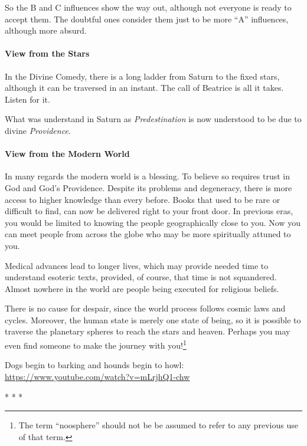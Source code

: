 So the B and C influences show the way out, although not everyone is ready to accept them. The doubtful ones consider them just to be more ``A'' influences, although more absurd.

\paragraph{View from the Stars}


In the Divine Comedy, there is a long ladder from Saturn to the fixed stars, although it can be traversed in an instant. The call of Beatrice is all it takes. Listen for it.

What was understand in Saturn as \emph{Predestination} is now understood to be due to divine \emph{Providence}.

\paragraph{View from the Modern World}


In many regards the modern world is a blessing. To believe so requires trust in God and God's Providence. Despite its problems and degeneracy, there is more access to higher knowledge than every before. Books that used to be rare or difficult to find, can now be delivered right to your front door. In previous eras, you would be limited to knowing the people geographically close to you. Now you can meet people from across the globe who may be more spiritually attuned to you.

Medical advances lead to longer lives, which may provide needed time to understand esoteric texts, provided, of course, that time is not squandered. Almost nowhere in the world are people being executed for religious beliefs.

There is no cause for despair, since the world process follows cosmic laws and cycles. Moreover, the human state is merely one state of being, so it is possible to traverse the planetary spheres to reach the stars and heaven. Perhaps you may even find someone to make the journey with you!\footnote{The term ``noosphere'' should not be be assumed to refer to any previous use of that term.}

Dogs begin to barking and hounds begin to howl: \url{https://www.youtube.com/watch?v=mLrjhQ1-chw} 


\begin{center}* * *\end{center}

